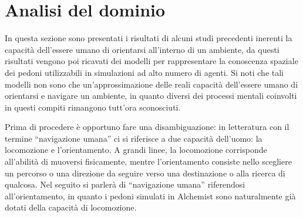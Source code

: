 \documentclass[12pt,a4paper,openright,oneside]{book}
\begin{document}
\section{Analisi del dominio}
In questa sezione sono presentati i risultati di alcuni studi precedenti inerenti la capacità dell’essere umano di orientarsi all’interno di un ambiente, da questi risultati vengono poi ricavati dei modelli per rappresentare la conoscenza spaziale dei pedoni utilizzabili in simulazioni ad alto numero di agenti. Si noti che tali modelli non sono che un’approssimazione delle reali capacità dell’essere umano di orientarsi e navigare un ambiente, in quanto diversi dei processi mentali coinvolti in questi compiti rimangono tutt’ora sconosciuti.

Prima di procedere è opportuno fare una disambiguazione: in letteratura con il termine “navigazione umana” ci si riferisce a due capacità dell’uomo: la locomozione e l’orientamento. A grandi linee, la locomozione corrisponde all’abilità di muoversi fisicamente, mentre l’orientamento consiste nello scegliere un percorso o una direzione da seguire verso una destinazione o alla ricerca di qualcosa. Nel seguito si parlerà di “navigazione umana” riferendosi all’orientamento, in quanto i pedoni simulati in Alchemist sono naturalmente già dotati della capacità di locomozione.
\end{document}
